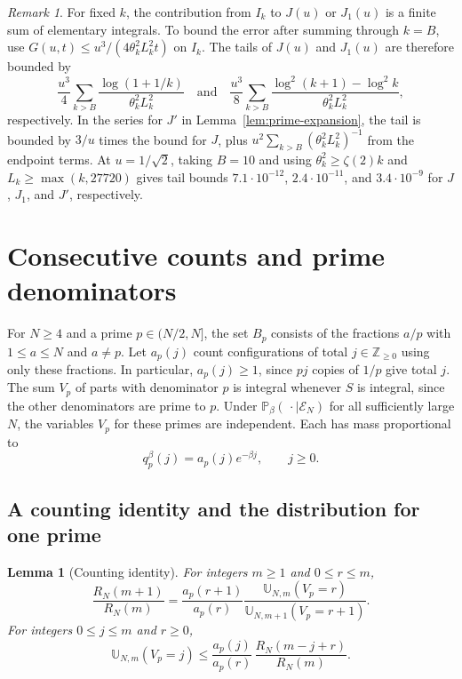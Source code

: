 \documentclass[11pt]{amsart}
\newtheorem{lemma}[theorem]{Lemma}
\theoremstyle{remark}
\newtheorem{remark}[theorem]{Remark}
\begin{document}
\begin{remark}
For fixed \(k\), the contribution from \(I_k\) to \(J(u)\) or \(J_1(u)\)
is a finite sum of elementary integrals. To bound the error after
summing through \(k=B\), use
\(G(u,t)\le u^3/(4\theta_k^2 L_k^2t)\) on \(I_k\).
The tails of \(J(u)\) and \(J_1(u)\) are therefore bounded by
\[
 \frac{u^3}{4}\sum_{k>B}\frac{\log(1+1/k)}{\theta_k^2 L_k^2}
 \quad\text{and}\quad
 \frac{u^3}{8}\sum_{k>B}
 \frac{\log^2(k+1)-\log^2 k}{\theta_k^2 L_k^2},
\]
respectively. In the series for \(J'\) in Lemma~\ref{lem:prime-expansion},
the tail is bounded by \(3/u\) times the bound for \(J\), plus
\(u^2\sum_{k>B}(\theta_k^2 L_k^2)^{-1}\) from the endpoint terms.
At \(u=1/\sqrt2\), taking \(B=10\) and using
\(\theta_k^2\ge\zeta(2)k\) and \(L_k\ge\max(k,27720)\) gives tail
bounds \(7.1\cdot10^{-12}\), \(2.4\cdot10^{-11}\), and
\(3.4\cdot10^{-9}\) for \(J\), \(J_1\), and \(J'\), respectively.
\end{remark}


\section{Consecutive counts and prime denominators}
\label{sec:exchange}

For \(N\ge4\) and a prime \(p\in(N/2,N]\), the set \(B_p\) consists
of the fractions \(a/p\) with \(1\le a\le N\) and \(a\ne p\).
Let \(a_p(j)\) count configurations of total \(j\in\mathbb Z_{\ge0}\)
using only these fractions. In particular, \(a_p(j)\ge1\), since \(pj\)
copies of \(1/p\) give total \(j\). The sum \(V_p\) of parts with denominator
\(p\) is integral whenever \(S\) is integral, since the other
denominators are prime to \(p\).
Under \(\mathbb P_\beta(\,\cdot\mid\mathcal E_N)\) for all sufficiently
large \(N\), the variables \(V_p\) for these primes are independent.
Each has mass proportional to
\[
    q_p^\beta(j)=a_p(j)e^{-\beta j},\qquad j\ge 0.
\]
\subsection{A counting identity and the distribution for one prime}

\begin{lemma}[Counting identity]
\label{lem:block-exchange}
For integers \(m\ge 1\) and \(0\le r\le m\),
\begin{equation}
\label{eq:block-exchange}
 \frac{R_N(m+1)}{R_N(m)}
 =\frac{a_p(r+1)}{a_p(r)}
   \frac{\mathbb U_{N,m}(V_p=r)}
        {\mathbb U_{N,m+1}(V_p=r+1)} .
\end{equation}
For integers \(0\le j\le m\) and \(r\ge 0\),
\begin{equation}
\label{eq:block-exchange-bound}
 \mathbb U_{N,m}(V_p=j)
 \le \frac{a_p(j)}{a_p(r)}\,\frac{R_N(m-j+r)}{R_N(m)} .
\end{equation}
\end{lemma}
\end{document}
